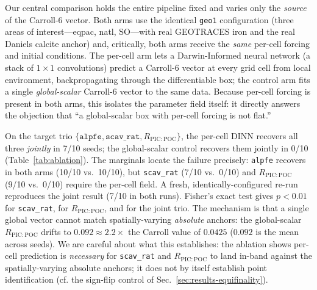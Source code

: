 \documentclass[11pt]{article}
\begin{document}
Our central comparison holds the entire pipeline fixed and varies only the
\emph{source} of the Carroll-6 vector. Both arms use the identical \texttt{geo1}
configuration (three areas of interest---eqpac, natl, SO---with real GEOTRACES
iron and the real Daniels calcite anchor) and, critically, both arms receive the
\emph{same} per-cell forcing and initial conditions. The per-cell arm lets a
Darwin-Informed neural network (a stack of $1{\times}1$ convolutions) predict a
Carroll-6 vector at every grid cell from local environment, backpropagating
through the differentiable box; the control arm fits a single \emph{global-scalar}
Carroll-6 vector to the same data. Because per-cell forcing is present in both
arms, this isolates the parameter field itself: it directly answers the
objection that ``a global-scalar box with per-cell forcing is not flat.''

On the target trio $\{\texttt{alpfe}, \texttt{scav\_rat}, R_{\mathrm{PIC:POC}}\}$,
the per-cell DINN recovers all three \emph{jointly} in 7/10 seeds; the
global-scalar control recovers them jointly in 0/10
(Table~\ref{tab:ablation}). The marginals locate the failure precisely:
\texttt{alpfe} recovers in both arms (10/10 vs.\ 10/10), but \texttt{scav\_rat}
(7/10 vs.\ 0/10) and $R_{\mathrm{PIC:POC}}$ (9/10 vs.\ 0/10) require the per-cell
field. A fresh, identically-configured re-run reproduces the joint result
(7/10 in both runs). Fisher's exact test gives $p<0.01$ for \texttt{scav\_rat},
for $R_{\mathrm{PIC:POC}}$, and for the joint trio. The mechanism is that a single
global vector cannot match spatially-varying \emph{absolute} anchors: the
global-scalar $R_{\mathrm{PIC:POC}}$ drifts to $0.092 \approx 2.2\times$ the
Carroll value of $0.0425$ ($0.092$ is the mean across seeds). We are careful about
what this establishes: the ablation shows per-cell prediction is \emph{necessary}
for \texttt{scav\_rat} and $R_{\mathrm{PIC:POC}}$ to land in-band against the
spatially-varying absolute anchors; it does not by itself establish point
identification (cf. the sign-flip control of
Sec.~\ref{sec:results-equifinality}).
\end{document}
